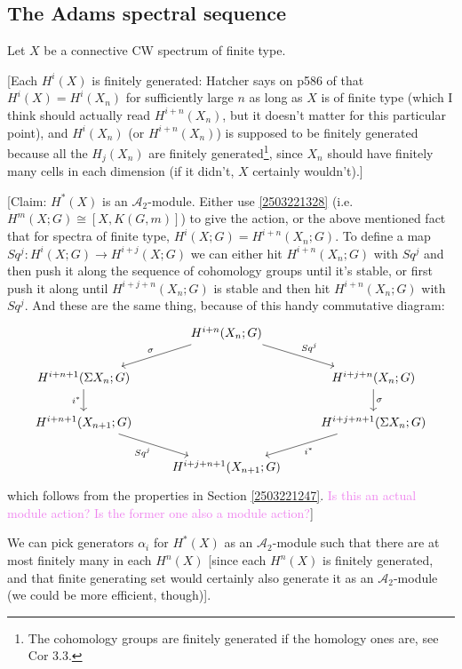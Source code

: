 \documentclass{MetricNotes2023}
\def\A{\ensuremath{\mathscr{A}_2}}
\def\textcolour{\textcolor}
\begin{document}
\subsection{The Adams spectral sequence}

Let \(X\) be a connective CW spectrum of finite type.

[Each \(H^i(X)\) is finitely generated: Hatcher says on p586 of \autocite{hatcher5} that \(H^i(X)=H^i(X_n)\) for sufficiently large \(n\) as long as \(X\) is of finite type (which I think should actually read \(H^{i+n}(X_n)\), but it doesn't matter for this particular point), and \(H^i(X_n)\) (or \(H^{i+n}(X_n)\)) is supposed to be finitely generated because all the \(H_j(X_n)\) are finitely generated\footnote{The cohomology groups are finitely generated if the homology ones are, see \autocite{hatcher} Cor 3.3.}, since \(X_n\) should have finitely many cells in each dimension (if it didn't, \(X\) certainly wouldn't).]

[Claim: \(H^*(X)\) is an \(\mathscr{A}_2\)-module. Either use \ref{2503221328} (i.e. \(H^m(X;G)\cong[X,K(G,m)]\)) to give the action, or the above mentioned fact that for spectra of finite type, \(H^i(X; G)=H^{i+n}(X_n;G)\). To define a map \(Sq^j : H^{i}(X;G)\to H^{i+j}(X;G)\) we can either hit \(H^{i+n}(X_n;G)\) with \(Sq^j\) and then push it along the sequence of cohomology groups until it's stable, or first push it along until \(H^{i+j+n}(X_n;G)\) is stable and then hit \(H^{i+n}(X_n;G)\) with \(Sq^j\). And these are the same thing, because of this handy commutative diagram:
\[\begin{tikzcd} 
 & H^{i+n}(X_n;G)  \arrow[dl, "\sigma"'] \arrow[dr, "Sq^j"] & \\ 
 H^{i+n+1}(\Sigma X_n;G) \arrow[d, "i^*"'] & & H^{i+j+n}(X_n;G) \arrow[d, "\sigma"] \\ 
 H^{i+n+1}(X_{n+1};G) \arrow[dr, "Sq^j"'] & & H^{i+j+n+1}(\Sigma X_n;G) \arrow[dl, "i^*"] \\ 
 & H^{i+j+n+1}(X_{n+1};G) &  
\end{tikzcd}\] 
which follows from the properties in Section  \ref{2503221247}. \textcolour{violet}{Is this an actual module action? Is the former one also a module action?}]

We can pick generators \(\alpha_i\) for \(H^*(X)\) as an \(\mathscr{A}_2\)-module such that there are at most finitely many in each \(H^n(X)\) [since each \(H^n(X)\) is finitely generated, and that finite generating set would certainly also generate it as an \(\A\)-module (we could be more efficient, though)].
\end{document}
